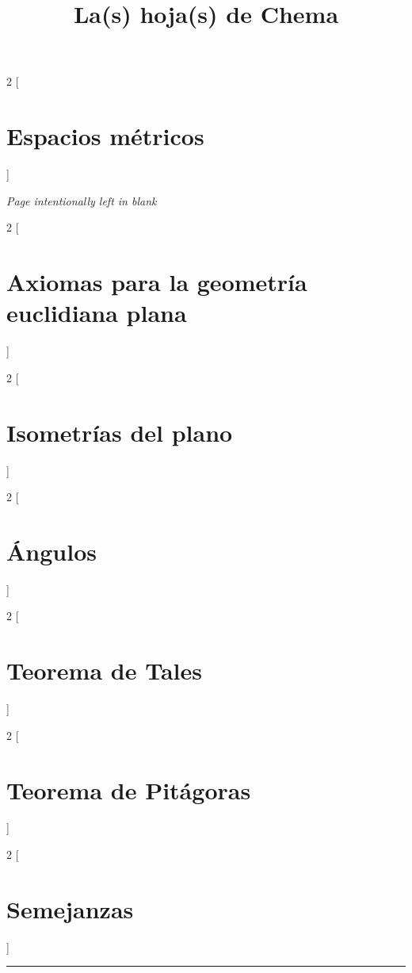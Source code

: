 \documentclass[a4paper, ]{article}
\title{\Huge{\vspace{-1em}La(s) hoja(s) de Chema}}
\author{}
\date{}
\begin{document}
		\maketitle

	\fontsize{12pt}{12pt}\selectfont
	\vspace*{-4em}
	
	\begin{multicols}{2}
	[
	\section{Espacios métricos}
	]
	
	\end{multicols}
	
	\pagebreak
	\textcolor{gris}{\textit{Page intentionally left in blank}}
	\newpage
	\pagebreak
	
	
	\begin{multicols*}{2}
	[\section{Axiomas para la geometría euclidiana plana}]
	\end{multicols*}\pagebreak


	\begin{multicols*}{2}
	[\section{Isometrías del plano}]
	\end{multicols*}\pagebreak
	
	
	\begin{multicols*}{2}
	[\section{Ángulos}]
	\end{multicols*}\pagebreak
	
		
	\begin{multicols*}{2}
	[\section{Teorema de Tales}]
	\end{multicols*}\pagebreak
	
	
	\begin{multicols*}{2}
	[\section{Teorema de Pitágoras}]
	\end{multicols*}\pagebreak
	

	\begin{multicols*}{2}
	[\section{Semejanzas}]
	\end{multicols*}\pagebreak
	
	
	 \noindent\rule{\linewidth}{0.4pt}
	 \doclicenseThis
	 
	 
	 
	 
	 
	 
	 
	 
	  	
 	
 	
 	
 	
 	
\end{document}

